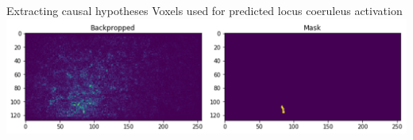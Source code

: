 \begin{frame}{ Extracting causal hypotheses }{Voxels used for predicted locus coeruleus activation}
    \includegraphics[width=\textwidth]{media/backprop_mask.png}
\end{frame}{}
